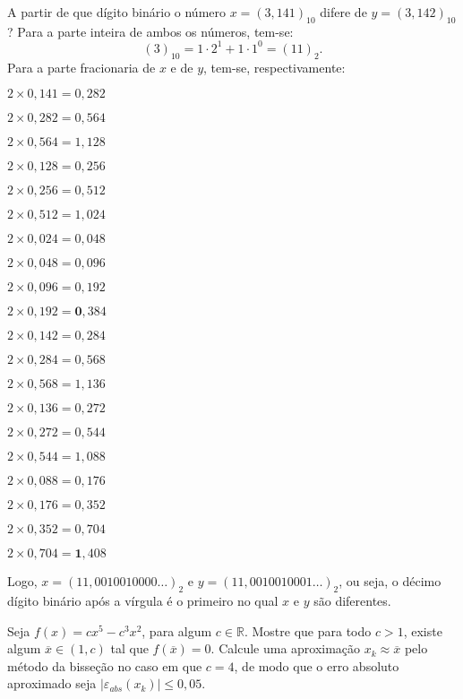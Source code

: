 \documentclass[12pt,a4paper]{article}
\newcommand*\R{\mathbb{R}}
\begin{document}
\begin{ExerciseList}
\Exercise[title={2,5}] A partir de que dígito binário o número $x = (3,141)_{10}$ difere de $y = (3,142)_{10}$?
\Answer Para a parte inteira de ambos os números, tem-se:
\[
(3)_{10} = 1 \cdot 2^1 + 1 \cdot 1^0 = (11)_{2}.
\]
Para a parte fracionaria de $x$ e de $y$, tem-se, respectivamente:
\begin{multicols}{2}
\begin{description}
\item $2 \times 0,141 = 0,282$
\item $2 \times 0,282 = 0,564$
\item $2 \times 0,564 = 1,128$
\item $2 \times 0,128 = 0,256$
\item $2 \times 0,256 = 0,512$
\item $2 \times 0,512 = 1,024$
\item $2 \times 0,024 = 0,048$
\item $2 \times 0,048 = 0,096$
\item $2 \times 0,096 = 0,192$
\item $2 \times 0,192 = \textbf{0},384$
\end{description}
\begin{description}
\item $2 \times 0,142 = 0,284$
\item $2 \times 0,284 = 0,568$
\item $2 \times 0,568 = 1,136$
\item $2 \times 0,136 = 0,272$
\item $2 \times 0,272 = 0,544$
\item $2 \times 0,544 = 1,088$
\item $2 \times 0,088 = 0,176$
\item $2 \times 0,176 = 0,352$
\item $2 \times 0,352 = 0,704$
\item $2 \times 0,704 = \textbf{1},408$
\end{description}
\end{multicols}
Logo, $x = (11,0010010000\ldots)_2$
e
$y = (11,0010010001\ldots)_2$, ou seja, o décimo dígito binário após a vírgula é o primeiro no qual $x$ e $y$ são diferentes.

\Exercise[title={2,5}] Seja $f(x) = cx^5-c^3x^2$, para algum $c \in \R$. Mostre que para todo $c > 1$, existe algum $\overline{x} \in (1, c)$ tal que $f(\overline{x}) = 0$. Calcule uma aproximação $x_k \approx \overline{x}$ pelo método da bisseção no caso em que $c = 4$, de modo que o erro absoluto aproximado seja $|\varepsilon_{abs}(x_k)| \leq 0,05$.


\end{ExerciseList}
\end{document}
